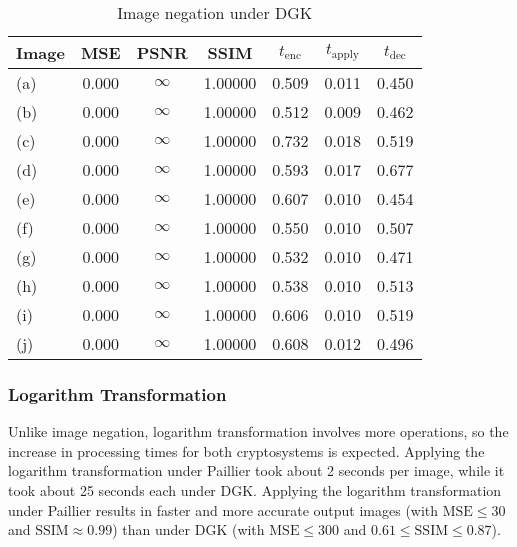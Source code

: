 \begin{table}[!ht]
	\centering
	\caption{Image negation under DGK}
	\label{tbl:neg-dgk}
    \begin{tabular}{lcccccc}
        \toprule
        Image & MSE  & PSNR & SSIM & $t_\text{enc}$ & $t_\text{apply}$ & $t_\text{dec}$ \\ \midrule
		(a) & 0.000 & $\infty$ & 1.00000 & 0.509 & 0.011 & 0.450 \\
		(b) & 0.000 & $\infty$ & 1.00000 & 0.512 & 0.009 & 0.462 \\
		(c) & 0.000 & $\infty$ & 1.00000 & 0.732 & 0.018 & 0.519 \\
		(d) & 0.000 & $\infty$ & 1.00000 & 0.593 & 0.017 & 0.677 \\
		(e) & 0.000 & $\infty$ & 1.00000 & 0.607 & 0.010 & 0.454 \\
		(f) & 0.000 & $\infty$ & 1.00000 & 0.550 & 0.010 & 0.507 \\
		(g) & 0.000 & $\infty$ & 1.00000 & 0.532 & 0.010 & 0.471 \\
		(h) & 0.000 & $\infty$ & 1.00000 & 0.538 & 0.010 & 0.513 \\
		(i) & 0.000 & $\infty$ & 1.00000 & 0.606 & 0.010 & 0.519 \\
		(j) & 0.000 & $\infty$ & 1.00000 & 0.608 & 0.012 & 0.496 \\
		\bottomrule
        \end{tabular}
\end{table}

\subsubsection{Logarithm Transformation}
Unlike image negation, logarithm transformation involves more operations, so the increase in processing times for both cryptosystems is expected. Applying the logarithm transformation under Paillier took about 2 seconds per image, while it took about 25 seconds each under DGK. Applying the logarithm transformation under Paillier results in faster and more accurate output images (with $\text{MSE} \le 30$ and $\text{SSIM} \approx 0.99$) than under DGK (with $\text{MSE} \le 300$ and $0.61 \le \text{SSIM} \le 0.87$).

